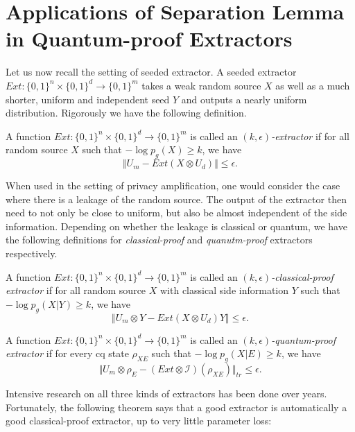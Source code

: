 \section{Applications of Separation Lemma in Quantum-proof Extractors}
\label{sec:re}
Let us now recall the setting of seeded extractor. A seeded extractor $Ext:\{0,1\}^n\times \{0,1\}^d\rightarrow \{0,1\}^m$ takes a weak random source $X$ as well as a much shorter, uniform and independent seed $Y$ and outputs a nearly uniform distribution. Rigorously we have the following definition.
\begin{definition}[Extractor]
    A function $Ext:\{0,1\}^n\times\{0,1\}^d\rightarrow \{0,1\}^m$ is called an \emph{$(k,\epsilon)$-extractor} if for all random source $X$ such that $-\log p_g(X)\geq k$, we have
    $$\Vert U_m-Ext(X\otimes U_d)\Vert\leq \epsilon.$$
\end{definition}

When used in the setting of privacy amplification, one would consider the case where there is a leakage of the random source. The output of the extractor then need to not only be close to uniform, but also be almost independent of the side information. Depending on whether the leakage is classical or quantum, we have the following definitions for \emph{classical-proof} and \emph{quanutm-proof} extractors respectively.

\begin{definition}
    A function $Ext:\{0,1\}^n\times\{0,1\}^d\rightarrow \{0,1\}^m$ is called an \emph{$(k,\epsilon)$-classical-proof extractor} if for all random source $X$ with classical side information $Y$ such that $-\log p_g(X|Y)\geq k$, we have
    $$\Vert U_m\otimes Y-Ext(X\otimes U_d)Y\Vert\leq \epsilon.$$
\end{definition}

\begin{definition}
    A function $Ext:\{0,1\}^n\times\{0,1\}^d\rightarrow \{0,1\}^m$ is called an \emph{$(k,\epsilon)$-quantum-proof extractor} if for every cq state $\rho_{XE}$  such that $-\log p_g(X|E)\geq k$, we have
    $$\Vert U_m\otimes \rho_E-(Ext\otimes \mathcal{I})(\rho_{XE})\Vert_{tr}\leq \epsilon.$$
\end{definition}

Intensive research on all three kinds of extractors has been done over years. Fortunately, the following theorem says that a good extractor is automatically a good classical-proof extractor, up to very little parameter loss:

